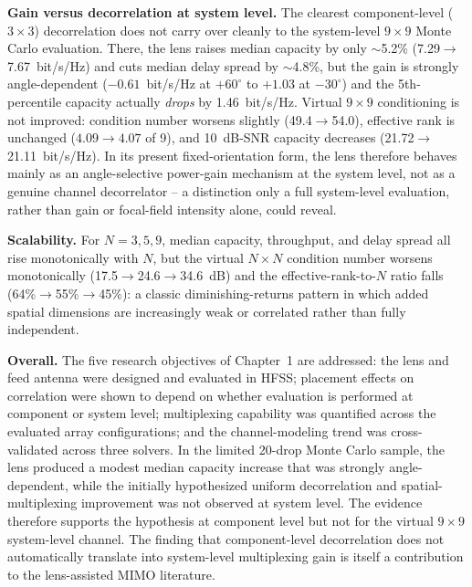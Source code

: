 \textbf{Gain versus decorrelation at system level.} The clearest component-level ($3\times3$) decorrelation does not carry over cleanly to the system-level $9\times9$ Monte Carlo evaluation. There, the lens raises median capacity by only $\sim$5.2\% (7.29$\to$7.67~bit/s/Hz) and cuts median delay spread by $\sim$4.8\%, but the gain is strongly angle-dependent ($-0.61$~bit/s/Hz at $+60^\circ$ to $+1.03$ at $-30^\circ$) and the 5th-percentile capacity actually \emph{drops} by 1.46~bit/s/Hz. Virtual $9\times9$ conditioning is not improved: condition number worsens slightly (49.4$\to$54.0), effective rank is unchanged ($4.09\to4.07$ of 9), and 10~dB-SNR capacity decreases (21.72$\to$21.11~bit/s/Hz). In its present fixed-orientation form, the lens therefore behaves mainly as an angle-selective power-gain mechanism at the system level, not as a genuine channel decorrelator -- a distinction only a full system-level evaluation, rather than gain or focal-field intensity alone, could reveal.

\textbf{Scalability.} For $N=3,5,9$, median capacity, throughput, and delay spread all rise monotonically with $N$, but the virtual $N\times N$ condition number worsens monotonically (17.5$\to$24.6$\to$34.6~dB) and the effective-rank-to-$N$ ratio falls (64\%$\to$55\%$\to$45\%): a classic diminishing-returns pattern in which added spatial dimensions are increasingly weak or correlated rather than fully independent.

\textbf{Overall.} The five research objectives of Chapter~1 are addressed: the lens and feed antenna were designed and evaluated in HFSS; placement effects on correlation were shown to depend on whether evaluation is performed at component or system level; multiplexing capability was quantified across the evaluated array configurations; and the channel-modeling trend was cross-validated across three solvers. In the limited 20-drop Monte Carlo sample, the lens produced a modest median capacity increase that was strongly angle-dependent, while the initially hypothesized uniform decorrelation and spatial-multiplexing improvement was not observed at system level. The evidence therefore supports the hypothesis at component level but not for the virtual $9\times9$ system-level channel. The finding that component-level decorrelation does not automatically translate into system-level multiplexing gain is itself a contribution to the lens-assisted MIMO literature.

